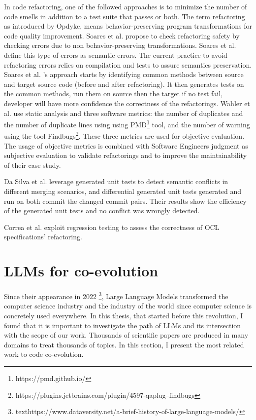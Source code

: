 In code refactoring, one of the followed approaches is to minimize the number of code smells in addition to a test suite that passes or both.
The term refactoring as introduced by Opdyke, means behavior-preserving program transformations for code quality improvement. 
Soares et al. \cite{soares2009generating} propose to check refactoring safety by checking errors due to non behavior-preserving transformations. Soares et al. \cite{soares2009generating} define this type of errors as semantic  errors. The current practice to avoid refactoring errors relies on compilation and tests to assure semantics preservation. Soares et al. \cite{soares2009generating}'s approach starts by identifying common methods between source and target source code (before and after refactoring). It then generates tests on the common methods, run them on source then the target if no test fail, developer will have more confidence the correctness of the refactorings.
Wahler et al. \cite{7816501} use static analysis and three software metrics: the number of duplicates and the number of duplicate lines using using PMD\footnote{https://pmd.github.io/} tool, and the number of warning using the tool Findbugs\footnote{https://plugins.jetbrains.com/plugin/4597-qaplug--findbugs}. These three metrics are used for objective evaluation. The usage of objective metrics is combined with Software Engineers judgment as subjective evaluation to validate refactorings and to improve the maintainability of their case study.

Da Silva et al. \cite{DASILVA2024112070} leverage generated unit tests to detect semantic conflicts in different merging scenarios, and differential generated unit tests generated and run on both commit the changed commit pairs. Their results show the efficiency of the generated unit tests and no conflict was wrongly detected.

Correa et al. \cite{correa2007refactoring} exploit regression testing to assess the correctness of OCL specifications' refactoring.
 
  \section{LLMs for co-evolution }
  \label{llmsforcoevolution}
  Since their appearance in 2022 \footnote{texthttps://www.dataversity.net/a-brief-history-of-large-language-models/}, Large Language Models transformed the computer science industry and the industry of the world since computer science is concretely used everywhere. In this thesis, that started before this revolution, I found that it is important to investigate the path of LLMs and its intersection with the scope of our work. Thousands of scientific papers are produced in many domains to treat thousands of topics. In this section, I present the most related work to code co-evolution.
  
